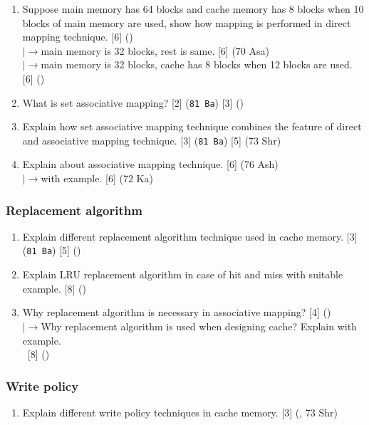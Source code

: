 \documentclass[12pt]{article}
\newcommand{\lb}{\\$\left|\rightarrow\right.$}
\newcommand{\enter}{\\\textcolor{white}{1}}
\begin{document}
\begin{enumerate}
			\item Suppose main memory has 64 blocks and cache memory has 8 blocks when 10 blocks of main memory are used, show how mapping is performed in direct mapping technique. \hfill [6] ()
			\lb main memory is 32 blocks, rest is same. \hfill [6] (70 Asa)
			\lb main memory is 32 blocks, cache has 8 blocks when 12 blocks are used. \hfill [6] ()

			\item What is set associative mapping? \hfill [2] (\texttt{81 Ba}) [3] ()

			\item Explain how set associative mapping technique combines the feature of direct and associative mapping technique. \hfill [3] (\texttt{81 Ba}) [5] (73 Shr)

			\item Explain about associative mapping technique. \hfill [6] (76 Ash)
			\lb with example. \hfill [6] (72 Ka)
		\end{enumerate}

	\subsubsection{Replacement algorithm}
		\begin{enumerate}
			\item Explain different replacement algorithm technique used in cache memory. \hfill [3] (\texttt{81 Ba}) [5] ()

			\item Explain LRU replacement algorithm in case of hit and miss with suitable example. \hfill [8] ()

			\item Why replacement algorithm is necessary in associative mapping? \hfill [4] ()
			\lb Why replacement algorithm is used when designing cache? Explain with example.
			\enter\hfill [8] ()
		\end{enumerate}

	\subsubsection{Write policy}
		\begin{enumerate}
			\item Explain different write policy techniques in cache memory. \hfill [3] (, 73 Shr)
		\end{enumerate}
\end{document}
